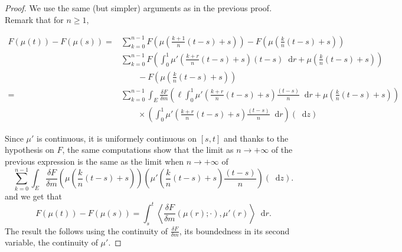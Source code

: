 \documentclass[a4paper,11pt, reqno]{amsart}
\newcommand{\dd}{\mathop{}\!\mathrm{d}}
\newcommand{\1}{\mathbbm{1}}
\theoremstyle{plain}
\theoremstyle{definition}
\begin{document}
\begin{proof}
  We use the same (but simpler) arguments as in the previous proof. Remark
  that for $n \ge 1$,
  
  \begin{align*}
    F (\mu (t)) - F (\mu (s)) = & \sum_{k = 0}^{n - 1} F \left( \mu \left(
    \frac{k + 1}{n} (t - s) + s \right) \right) - F \left( \mu \left(
    \frac{k}{n} (t - s) + s \right) \right)\\
    & \sum_{k = 0}^{n - 1} F \left( \int_0^1 \mu' \left( \frac{k + r}{n} (t -
    s) + s \right) (t - s) \dd r + \mu \left( \frac{k}{n} (t - s) + s
    \right) \right)\\
    & \qquad - F \left( \mu \left( \frac{k}{n} (t - s) + s \right) \right)\\
    = & \sum_{k = 0}^{n - 1} \int_E \frac{\delta F}{\delta m} \left( \ell
    \int_0^1 \mu' \left( \frac{k + r}{n} (t - s) + s \right) \frac{(t - s)}{n}
    \dd r + \mu \left( \frac{k}{n} (t - s) + s \right) \right)\\
    & \qquad \times \left( \int_0^1 \mu' \left( \frac{k + r}{n} (t - s) + s
    \right) \frac{(t - s)}{n} \dd r \right) (\dd z)
  \end{align*}
  
  Since $\mu'$ is continuous, it is uniformely continuous on $[s, t]$ and
  thanks to the hypothesis on $F$, the same computations show that the limit
  as $n \rightarrow + \infty$ of the previous expression is the same as the
  limit when $n \rightarrow + \infty$ of
  \[ \sum_{k = 0}^{n - 1} \int_E \frac{\delta F}{\delta m} \left( \mu \left(
     \frac{k}{n} (t - s) + s \right) \right) \left( \mu' \left( \frac{k}{n} (t
     - s) + s \right) \frac{(t - s)}{n} \right) (\dd z) . \]
  and we get that
  \[ F (\mu (t)) - F (\mu (s)) = \int_s^t \left\langle \frac{\delta F}{\delta
     m} (\mu (r) ; \cdot), \mu' (r) \right\rangle \dd r. \]
  The result the follows using the continuity of $\frac{\delta F}{\delta m}$,
  its boundedness in its second variable, the continuity of $\mu'$.
\end{proof}
\end{document}
